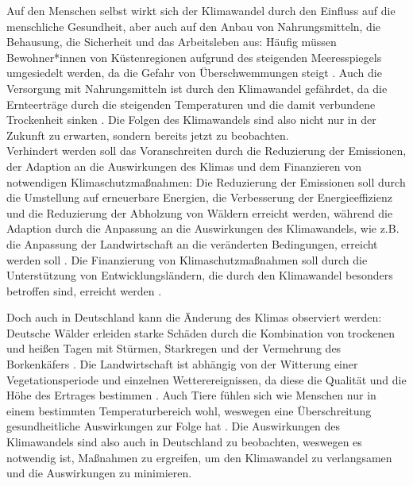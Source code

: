 Auf den Menschen selbst wirkt sich der Klimawandel durch den Einfluss auf die menschliche Gesundheit, aber auch auf den Anbau von Nahrungsmitteln, die Behausung, die Sicherheit und das Arbeitsleben aus: Häufig müssen Bewohner*innen von Küstenregionen aufgrund des steigenden Meeresspiegels umgesiedelt werden, da die Gefahr von Überschwemmungen steigt \cite{UnitedNationsClimateChange}. Auch die Versorgung mit Nahrungsmitteln ist durch den Klimawandel gefährdet, da die Ernteerträge durch die steigenden Temperaturen und die damit verbundene Trockenheit sinken \cite{UnitedNationsClimateChange}. Die Folgen des Klimawandels sind also nicht nur in der Zukunft zu erwarten, sondern bereits jetzt zu beobachten. \\ Verhindert werden soll das Voranschreiten durch die Reduzierung der Emissionen, der Adaption an die Auswirkungen des Klimas und dem Finanzieren von notwendigen Klimaschutzmaßnahmen: Die Reduzierung der Emissionen soll durch die Umstellung auf erneuerbare Energien, die Verbesserung der Energieeffizienz und die Reduzierung der Abholzung von Wäldern erreicht werden, während die Adaption durch die Anpassung an die Auswirkungen des Klimawandels, wie z.B. die Anpassung der Landwirtschaft an die veränderten Bedingungen, erreicht werden soll \cite{UnitedNationsClimateChange}. Die Finanzierung von Klimaschutzmaßnahmen soll durch die Unterstützung von Entwicklungsländern, die durch den Klimawandel besonders betroffen sind, erreicht werden \cite{UnitedNationsClimateChange}.

Doch auch in Deutschland kann die Änderung des Klimas observiert werden: Deutsche Wälder erleiden starke Schäden durch die Kombination von trockenen und heißen Tagen mit Stürmen, Starkregen und der Vermehrung des Borkenkäfers \cite{UmweltbundesamtRisikoanalyse2021}. Die Landwirtschaft ist abhängig von der Witterung einer Vegetationsperiode und einzelnen Wetterereignissen, da diese die Qualität und die Höhe des Ertrages bestimmen \cite{UmweltbundesamtRisikoanalyse2021}. Auch Tiere fühlen sich wie Menschen nur in einem bestimmten Temperaturbereich wohl, weswegen eine Überschreitung gesundheitliche Auswirkungen zur Folge hat \cite{UmweltbundesamtRisikoanalyse2021}. Die Auswirkungen des Klimawandels sind also auch in Deutschland zu beobachten, weswegen es notwendig ist, Maßnahmen zu ergreifen, um den Klimawandel zu verlangsamen und die Auswirkungen zu minimieren.

